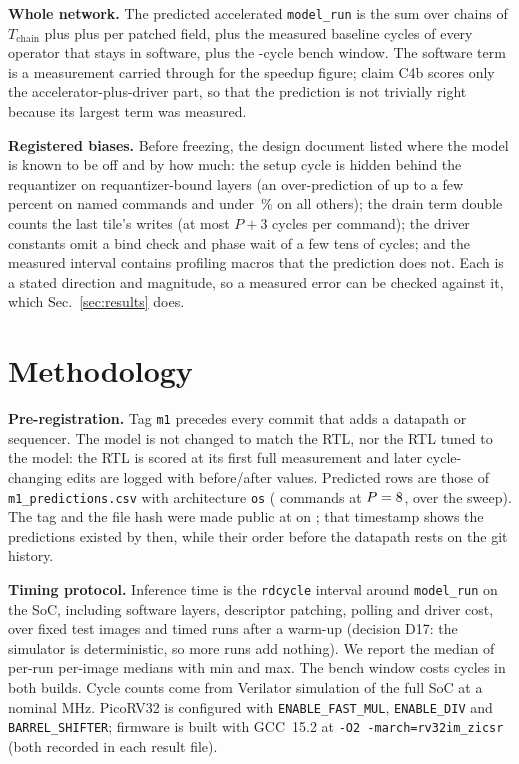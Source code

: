 \documentclass[conference]{IEEEtran}
\begin{document}
\textbf{Whole network.} The predicted accelerated \texttt{model\_run} is the sum over chains of $T_{\mathrm{chain}}$ plus \DrvChain{} plus \DrvPatch{} per patched field, plus the measured baseline cycles of every operator that stays in software, plus the \BenchWindow-cycle bench window. The software term is a measurement carried through for the speedup figure; claim C4b scores only the accelerator-plus-driver part, so that the prediction is not trivially right because its largest term was measured.

\textbf{Registered biases.} Before freezing, the design document listed where the model is known to be off and by how much: the setup cycle is hidden behind the requantizer on requantizer-bound layers (an over-prediction of up to a few percent on named commands and under \BiasDefault\,\% on all others); the drain term double counts the last tile's writes (at most $P+3$ cycles per command); the driver constants omit a bind check and phase wait of a few tens of cycles; and the measured interval contains profiling macros that the prediction does not. Each is a stated direction and magnitude, so a measured error can be checked against it, which Sec.~\ref{sec:results} does.

\section{Methodology}\label{sec:method}
\textbf{Pre-registration.} Tag \texttt{m1} precedes every commit that adds a datapath or sequencer. The model is not changed to match the RTL, nor the RTL tuned to the model: the RTL is scored at its first full measurement and later cycle-changing edits are logged with before/after values. Predicted rows are those of \texttt{m1\_predictions.csv} with architecture \texttt{os} (\MOneRowsPeight{} commands at $P=8$, \MOneRows{} over the sweep). The tag and the file hash were made public at \PreregUrl{} on \PreregDate{}; that timestamp shows the predictions existed by then, while their order before the datapath rests on the git history.

\textbf{Timing protocol.} Inference time is the \texttt{rdcycle} interval around \texttt{model\_run} on the SoC, including software layers, descriptor patching, polling and driver cost, over \BaselineImagesMnist{} fixed test images and \BaselineRunsMnist{} timed runs after a warm-up (decision D17: the simulator is deterministic, so more runs add nothing). We report the median of per-run per-image medians with min and max. The bench window costs \BenchWindow{} cycles in both builds. Cycle counts come from Verilator simulation of the full SoC at a nominal \ClockMHzMnist{} MHz. PicoRV32 is configured with \texttt{ENABLE\_FAST\_MUL}, \texttt{ENABLE\_DIV} and \texttt{BARREL\_SHIFTER}; firmware is built with GCC~15.2 at \texttt{-O2 -march=rv32im\_zicsr} (both recorded in each result file).
\end{document}
